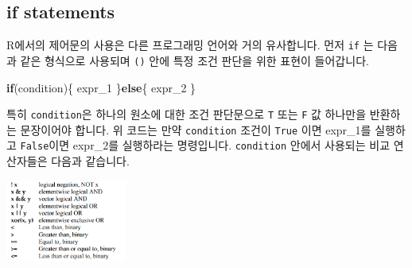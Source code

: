 \documentclass[
]{book}
\newenvironment{Shaded}{\begin{snugshade}}{\end{snugshade}}
\newcommand{\ControlFlowTok}[1]{\textcolor[rgb]{0.13,0.29,0.53}{\textbf{#1}}}
\newcommand{\NormalTok}[1]{#1}
\begin{document}
\hypertarget{if-statements}{%
\subsection{if statements}\label{if-statements}}

R에서의 제어문의 사용은 다른 프로그래밍 언어와 거의 유사합니다. 먼저 \texttt{if} 는 다음과 같은 형식으로 사용되며 \texttt{()} 안에 특정 조건 판단을 위한 표현이 들어갑니다.

\begin{Shaded}
\begin{Highlighting}[]
\ControlFlowTok{if}\NormalTok{(condition)\{}
\NormalTok{  expr\_1}
\NormalTok{\}}\ControlFlowTok{else}\NormalTok{\{}
\NormalTok{  expr\_2}
\NormalTok{\}}
\end{Highlighting}
\end{Shaded}

특히 \texttt{condition}은 하나의 원소에 대한 조건 판단문으로 \texttt{T} 또는 \texttt{F} 값 하나만을 반환하는 문장이어야 합니다. 위 코드는 만약 \texttt{condition} 조건이 \texttt{True} 이면 expr\_1를 실행하고 \texttt{False}이면 expr\_2를 실행하라는 명령입니다. \texttt{condition} 안에서 사용되는 비교 연산자들은 다음과 같습니다.

\includegraphics[width=1.5625in,height=\textheight]{images/04/01.PNG}
\end{document}

